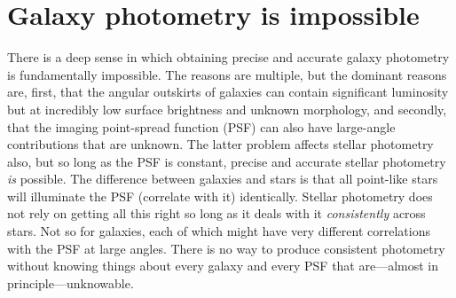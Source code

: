 \documentclass[12pt,preprint,pdftex]{aastex}
\begin{document}
\section{Galaxy photometry is impossible}\label{sec:philosophy}

There is a deep sense in which obtaining precise and accurate galaxy
photometry is fundamentally impossible.  The reasons are multiple, but
the dominant reasons are, first, that the angular outskirts of
galaxies can contain significant luminosity but at incredibly low
surface brightness and unknown morphology, and secondly, that the
imaging point-spread function (PSF) can also have large-angle
contributions that are unknown.  The latter problem affects stellar
photometry also, but so long as the PSF is constant, precise and
accurate stellar photometry \emph{is} possible.  The difference
between galaxies and stars is that all point-like stars will
illuminate the PSF (correlate with it) identically.  Stellar
photometry does not rely on getting all this right so long as it deals
with it \emph{consistently} across stars.  Not so for galaxies, each
of which might have very different correlations with the PSF at large
angles.  There is no way to produce consistent photometry without
knowing things about every galaxy and every PSF that are---almost in
principle---unknowable.
\end{document}
